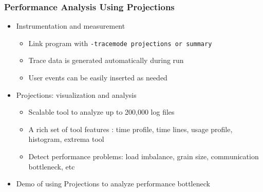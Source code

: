 \begin{frame}
  \frametitle{Performance Analysis Using Projections}
  \begin{itemize}
  \item Instrumentation and measurement
  \begin{itemize}
  \item Link program with {\tt -tracemode projections or summary}
  \item Trace data is generated automatically during run
  \item User events can be easily inserted as needed
  \end{itemize}
  \item Projections: visualization and analysis
  \begin{itemize}
  \item Scalable tool to analyze up to 200,000 log files
  \item A rich set of tool features : time profile, time lines, usage profile, histogram, extrema tool
  \item Detect performance problems: load imbalance, grain size, communication bottleneck, etc 
  \end{itemize}
  \item Demo of using Projections to analyze performance bottleneck
  \end{itemize}

\end{frame}
